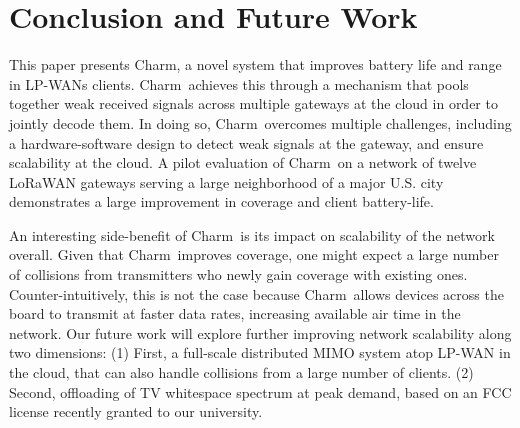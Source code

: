 \section{Conclusion and Future Work}
\label{sec:conclusion}


This paper presents Charm, a novel system that improves battery life and range in LP-WANs clients. Charm\ achieves this through a mechanism that pools together weak received signals across multiple gateways at the cloud in order to jointly decode them. In doing so, Charm\ overcomes multiple challenges, including a hardware-software design to detect weak signals at the gateway, and ensure scalability at the cloud. A pilot evaluation of Charm\ on a network of twelve LoRaWAN gateways serving a large neighborhood of a major U.S. city demonstrates a large improvement in coverage and client battery-life.

An interesting side-benefit of Charm\ is its impact on scalability of the network overall. Given that Charm\ improves coverage, one might expect a large number of collisions from transmitters who newly gain coverage with existing ones. Counter-intuitively, this is not the case because Charm\ allows devices across the board to transmit at faster data rates, increasing available air time in the network. Our future work will explore further improving network scalability along two dimensions: (1) First, a full-scale distributed MIMO system atop LP-WAN in the cloud, that can also handle collisions from a large number of clients. (2) Second, offloading of TV whitespace spectrum at peak demand, based on an FCC license recently granted to our university.  



